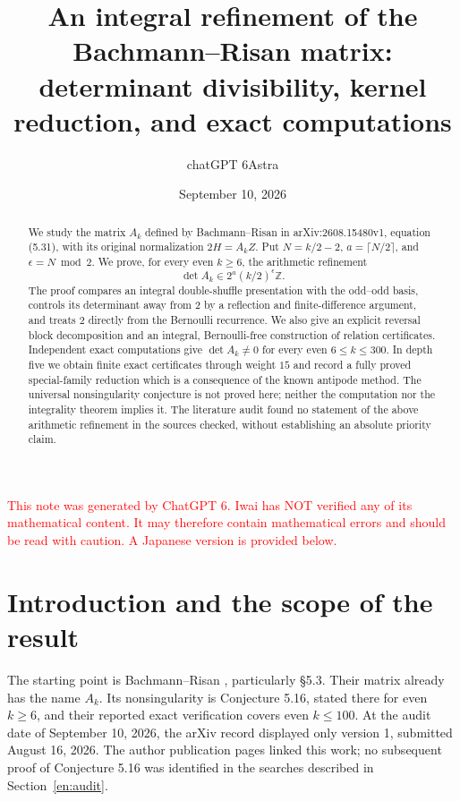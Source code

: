 \documentclass[12pt]{amsart}
\title[Integral refinement of the Bachmann--Risan matrix]{An integral refinement of the Bachmann--Risan matrix:\\determinant divisibility, kernel reduction, and exact computations}
\author{chatGPT 6Astra}
\date{September 10, 2026}
\theoremstyle{definition}
\theoremstyle{remark}
\numberwithin{equation}{section}
\newcommand{\Z}{\mathbb{Z}}
\newcommand{\xr}[1]{\textcolor{red}{#1}}
\theoremstyle{definition}
\theoremstyle{remark}
\begin{document}
\raggedbottom
\begin{abstract}
We study the matrix $A_k$ defined by Bachmann--Risan in
arXiv:\allowbreak2608.15480v1, equation (5.31), with its original normalization
$2H=A_kZ$. Put $N=k/2-2$, $a=\lceil N/2\rceil$, and
$\epsilon=N\bmod 2$. We prove, for every even $k\geq6$, the arithmetic refinement
\[
 \det A_k\in 2^a(k/2)^\epsilon\Z.
\]
The proof compares an integral double-shuffle presentation with the
odd--odd basis, controls its determinant away from $2$ by a reflection
and finite-difference argument, and treats $2$ directly from the
Bernoulli recurrence. We also give an explicit reversal block decomposition
and an integral, Bernoulli-free construction of relation certificates.
Independent exact computations give $\det A_k\ne0$ for every even
$6\leq k\leq300$. In depth five we obtain finite exact certificates through
weight $15$ and record a fully proved special-family reduction which is
a consequence of the known antipode method. The universal nonsingularity
conjecture is not proved here; neither the computation nor the integrality
theorem implies it. The literature audit found no statement of the above
arithmetic refinement in the sources checked, without establishing an
absolute priority claim.
\end{abstract}
\maketitle

\xr{This note was generated by ChatGPT 6. Iwai has NOT verified any of its mathematical content. It may therefore contain mathematical errors and should be read with caution. A Japanese version is provided below.}


\section{Introduction and the scope of the result}
The starting point is Bachmann--Risan \cite{BR}, particularly
\S5.3. Their matrix already has the name $A_k$. Its nonsingularity is
Conjecture 5.16, stated there for even $k\geq6$, and their reported exact
verification covers even $k\leq100$. At the audit date of September 10,
2026, the arXiv record displayed only version 1, submitted August 16,
2026. The author publication pages linked this work; no subsequent proof
of Conjecture 5.16 was identified in the searches described in
Section~\ref{en:audit}.
\end{document}
